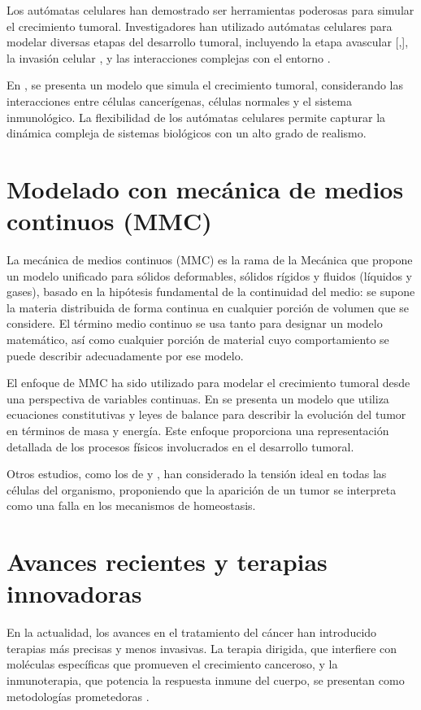 Los autómatas celulares han demostrado ser herramientas poderosas para simular el crecimiento tumoral. Investigadores han utilizado autómatas celulares para modelar diversas etapas del desarrollo tumoral, incluyendo la etapa avascular [\cite{dormann},\cite{kansal2}], la invasión celular \cite{rejniak}, y las interacciones complejas con el entorno \cite{rejniak}.

En \cite{ruanxiaoca}, se presenta un modelo que simula el crecimiento tumoral, considerando las interacciones entre células cancerígenas, células normales y el sistema inmunológico. La flexibilidad de los autómatas celulares permite capturar la dinámica compleja de sistemas biológicos con un alto grado de realismo.

\section{Modelado con mecánica de medios continuos (MMC)}
La mecánica de medios continuos (MMC) es la rama de la Mecánica que propone un modelo unificado para sólidos deformables, sólidos rígidos y fluidos (líquidos y gases), basado en la hipótesis fundamental de la continuidad del medio: se supone la materia distribuida de forma continua en cualquier porción de volumen que se considere. El término medio continuo se usa tanto para designar un modelo matemático, así como cualquier porción de material cuyo comportamiento se puede describir adecuadamente por ese modelo.

El enfoque de MMC ha sido utilizado para modelar el crecimiento tumoral desde una perspectiva de variables continuas. En \cite{ariel} se presenta un modelo que utiliza ecuaciones constitutivas y leyes de balance para describir la evolución del tumor en términos de masa y energía. Este enfoque proporciona una representación detallada de los procesos físicos involucrados en el desarrollo tumoral.

Otros estudios, como los de \cite{preziosi} y \cite{preziosi2}, han considerado la tensión ideal en todas las células del organismo, proponiendo que la aparición de un tumor se interpreta como una falla en los mecanismos de homeostasis.

\section{Avances recientes y terapias innovadoras}

En la actualidad, los avances en el tratamiento del cáncer han introducido terapias más precisas y menos invasivas. La terapia dirigida, que interfiere con moléculas específicas que promueven el crecimiento canceroso, y la inmunoterapia, que potencia la respuesta inmune del cuerpo, se presentan como metodologías prometedoras \cite{soerjomataram2020}\cite{seke2021}.

